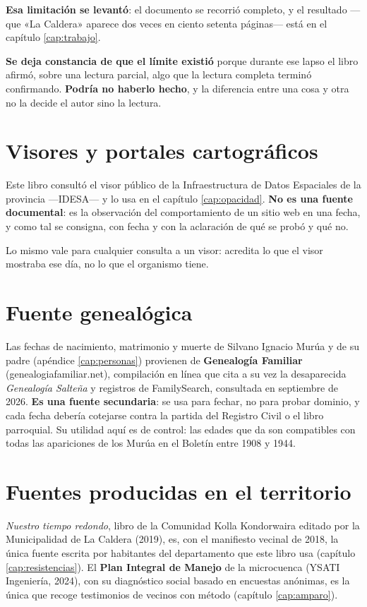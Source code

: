 \textbf{Esa limitación se levantó}: el documento se recorrió completo, y el resultado ---que «La Caldera» aparece dos veces en ciento setenta páginas--- está en el capítulo \ref{cap:trabajo}.

\textbf{Se deja constancia de que el límite existió} porque durante ese lapso el libro afirmó, sobre una lectura parcial, algo que la lectura completa terminó confirmando. \textbf{Podría no haberlo hecho}, y la diferencia entre una cosa y otra no la decide el autor sino la lectura.

\section{Visores y portales cartográficos}

Este libro consultó el visor público de la Infraestructura de Datos Espaciales de la provincia
---IDESA--- y lo usa en el capítulo \ref{cap:opacidad}. \textbf{No es una fuente documental}: es
la observación del comportamiento de un sitio web en una fecha, y como tal se consigna, con
fecha y con la aclaración de qué se probó y qué no.

Lo mismo vale para cualquier consulta a un visor: acredita lo que el visor mostraba ese día, no
lo que el organismo tiene.

\section{Fuente genealógica}

Las fechas de nacimiento, matrimonio y muerte de Silvano Ignacio Murúa y de su padre (apéndice
\ref{cap:personas}) provienen de \textbf{Genealogía Familiar} (genealogiafamiliar.net), compilación
en línea que cita a su vez la desaparecida \textit{Genealogía Salteña} y registros de FamilySearch,
consultada en septiembre de 2026. \textbf{Es una fuente secundaria}: se usa para fechar, no para
probar dominio, y cada fecha debería cotejarse contra la partida del Registro Civil o el libro
parroquial. Su utilidad aquí es de control: las edades que da son compatibles con todas las
apariciones de los Murúa en el Boletín entre 1908 y 1944.

\section{Fuentes producidas en el territorio}

\textit{Nuestro tiempo redondo}, libro de la Comunidad Kolla Kondorwaira editado por la Municipalidad de La Caldera (2019), es, con el manifiesto vecinal de 2018, la única fuente escrita por habitantes del departamento que este libro usa (capítulo \ref{cap:resistencias}). El \textbf{Plan Integral de Manejo} de la microcuenca (YSATI Ingeniería, 2024), con su diagnóstico social basado en encuestas anónimas, es la única que recoge testimonios de vecinos con método (capítulo \ref{cap:amparo}).


